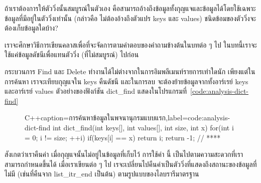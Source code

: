 \begin{quiz}{}
ถ้า{\wbr}เรา{\wbr}ต้องการ{\wbr}ให้{\wbr}ตัว{\wbr}วิ่ง{\wbr}นั้น{\wbr}สมบูรณ์{\wbr}ใน{\wbr}ตัวเอง{\wbr}
คือ{\wbr}สามารถ{\wbr}อ้าง{\wbr}ถึง{\wbr}ข้อมูล{\wbr}ทั้ง{\wbr}กุญแจ{\wbr}และ{\wbr}ข้อมูล{\wbr}ได้{\wbr}โดย{\wbr}ใช้{\wbr}เฉพาะ{\wbr}ข้อมูล{\wbr}ที่{\wbr}มี{\wbr}อยู่{\wbr}ใน{\wbr}ตัว{\wbr}วิ่ง{\wbr}เท่านั้น (กล่าวคือ{\wbr}
ไม่{\wbr}ต้อง{\wbr}อ้าง{\wbr}ถึง{\wbr}ตัวแปร {\ct keys} และ {\ct values})
ชนิด{\wbr}ข้อ{\wbr}ม{\wbr}ของ{\wbr}ตัว{\wbr}วิ่ง{\wbr}จะ{\wbr}ต้อง{\wbr}เก็บ{\wbr}ข้อมูล{\wbr}ใด{\wbr}บ้าง?
\end{quiz}

เรา{\wbr}จะ{\wbr}ศึกษา{\wbr}วิธีการ{\wbr}เขียน{\wbr}ค{\wbr}ลา{\wbr}ส{\wbr}เพื่อที่จะ{\wbr}จัดการ{\wbr}ตาม{\wbr}คำตอบ{\wbr}ของ{\wbr}คำถาม{\wbr}ข้างต้น{\wbr}ใน{\wbr}บท{\wbr}ต่อ ๆ ไป{\wbr}
ใน{\wbr}บท{\wbr}นี้{\wbr}เรา{\wbr}จะ{\wbr}ใช้{\wbr}แค่{\wbr}ข้อมูล{\wbr}ดัชนี{\wbr}เพื่อ{\wbr}แทน{\wbr}ตัว{\wbr}วิ่ง (ที่{\wbr}ไม่{\wbr}สมบูรณ์) ไป{\wbr}ก่อน{\wbr}

กระบวนการ Find และ Delete ทำงาน{\wbr}ได้{\wbr}ไม่{\wbr}ต่าง{\wbr}จาก{\wbr}ใน{\wbr}การ{\wbr}อิม{\wbr}พลี{\wbr}เมนท์{\wbr}รายการ{\wbr}เท่าใด{\wbr}นัก{\wbr}
เพียงแต่{\wbr}ใน{\wbr}การ{\wbr}ค้นหา เรา{\wbr}จะ{\wbr}เทียบ{\wbr}กุญแจ{\wbr}ใน {\ct keys} คืน{\wbr}ดัชนี และ{\wbr}ใน{\wbr}การ{\wbr}ลบ{\wbr}
จะ{\wbr}ต้อง{\wbr}ย้าย{\wbr}ข้อมูล{\wbr}จาก{\wbr}ทั้ง{\wbr}อาร์เรย์ {\ct keys} และ{\wbr}อาร์เรย์ {\ct values}
ตัวอย่าง{\wbr}ของ{\wbr}ฟังก์ชัน {\ct dict\_find }
แสดง{\wbr}ใน{\wbr}โปรแกรม{\wbr}ที่~\ref{code:analysis-dict-find}

\begin{figure}
\latintext
\begin{codelist}{C++}{caption={\thaitext การ{\wbr}ค้นหา{\wbr}ข้อมูล{\wbr}ใน{\wbr}พจนานุกรม{\wbr}แบบ{\wbr}แรก\latintext},label=code:analysis-dict-find}
int dict_find(int keys[], int values[], int size, int x)
{
  for(int i = 0; i != size; ++i)
    if(keys[i] == x)
      return i;
  return -1;                // ****
}
\end{codelist}
\thaitext
\end{figure}

สังเกต{\wbr}ว่า{\wbr}เรา{\wbr}คืน{\wbr}ค่า {} เมื่อ{\wbr}กุญแจ{\wbr}นั้น{\wbr}ไม่{\wbr}อยู่{\wbr}ใน{\wbr}ข้อมูล{\wbr}ที่{\wbr}เก็บ{\wbr}ไว้ การ{\wbr}ใช้{\wbr}ค่า {} นี้{\wbr}
เป็น{\wbr}ไป{\wbr}ตาม{\wbr}ความ{\wbr}สะดวก{\wbr}ที่{\wbr}เรา{\wbr}สามารถ{\wbr}กำหนด{\wbr}ขึ้น{\wbr}ได้ เมื่อ{\wbr}เรา{\wbr}เขียน{\wbr}ต่อ ๆ ไป{\wbr}
เรจะ{\wbr}เปลี่ยน{\wbr}ไป{\wbr}คืน{\wbr}ค่า{\wbr}เป็น{\wbr}ตัว{\wbr}วิ่ง{\wbr}ที่{\wbr}แสดง{\wbr}ถึง{\wbr}สถานะ{\wbr}ของ{\wbr}ข้อมูล{\wbr}ที่{\wbr}ไม่{\wbr}มี (เช่น{\wbr}ที่{\wbr}คืน{\wbr}จาก {\ct
  list\_itr\_end} เป็นต้น) ตาม{\wbr}รูปแบบ{\wbr}ของ{\wbr}ไลบ{\wbr}รา{\wbr}รี{\wbr}มาตรฐาน{\wbr}

